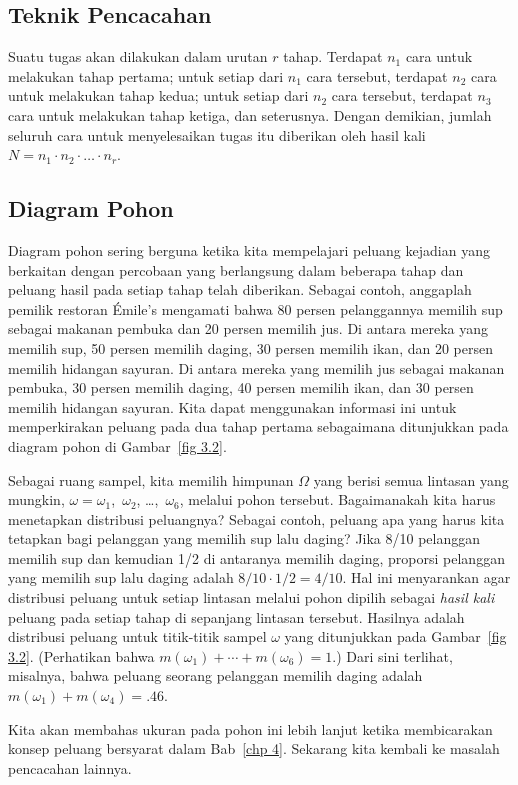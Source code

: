 
\subsection*{Teknik Pencacahan}

Suatu tugas akan dilakukan dalam urutan $r$ tahap.  Terdapat $n_1$ cara untuk
melakukan tahap pertama; untuk setiap dari $n_1$ cara tersebut, terdapat $n_2$ cara
untuk melakukan tahap kedua; untuk setiap dari $n_2$ cara tersebut, terdapat
$n_3$ cara untuk melakukan tahap ketiga, dan seterusnya.  Dengan demikian, jumlah
seluruh cara untuk menyelesaikan tugas itu diberikan oleh hasil kali
$N = n_1 \cdot n_2 \cdot \dots \cdot n_r$.

 
\subsection*{Diagram Pohon}

Diagram pohon sering berguna ketika kita mempelajari peluang kejadian yang berkaitan
dengan percobaan yang berlangsung dalam beberapa tahap dan peluang hasil pada setiap
tahap telah diberikan.  Sebagai contoh, anggaplah pemilik restoran \'Emile's mengamati
bahwa 80 persen pelanggannya memilih sup sebagai makanan pembuka dan 20 persen memilih
jus.  Di antara mereka yang memilih sup, 50 persen memilih daging, 30 persen memilih
ikan, dan 20 persen memilih hidangan sayuran.  Di antara mereka yang memilih jus sebagai
makanan pembuka, 30 persen memilih daging, 40 persen memilih ikan, dan 30 persen memilih
hidangan sayuran.  Kita dapat menggunakan informasi ini untuk memperkirakan peluang pada
dua tahap pertama sebagaimana ditunjukkan pada diagram pohon di Gambar~\ref{fig 3.2}.

Sebagai ruang sampel, kita memilih himpunan $\Omega$ yang berisi semua lintasan yang
mungkin, $\omega =
\omega_1$,~$\omega_2$, \dots,~$\omega_6$, melalui pohon tersebut.
Bagaimanakah kita harus menetapkan distribusi peluangnya?  Sebagai contoh, peluang apa
yang harus kita tetapkan bagi pelanggan yang memilih sup lalu daging?  Jika 8/10
pelanggan memilih sup dan kemudian 1/2 di antaranya memilih daging, proporsi pelanggan
yang memilih sup lalu daging adalah $8/10 \cdot 1/2 = 4/10$.  Hal ini menyarankan agar
distribusi peluang untuk setiap lintasan melalui pohon dipilih sebagai {\em hasil kali}
peluang pada setiap tahap di sepanjang lintasan tersebut.  Hasilnya adalah distribusi
peluang untuk titik-titik sampel $\omega$ yang ditunjukkan pada Gambar~\ref{fig 3.2}.
(Perhatikan bahwa $m(\omega_1) + \cdots +
m(\omega_6) = 1$.)  Dari sini terlihat,
misalnya, bahwa peluang seorang pelanggan memilih daging adalah
$m(\omega_1) + m(\omega_4) = .46$.
\par
Kita akan membahas ukuran pada pohon ini lebih lanjut ketika membicarakan konsep
peluang bersyarat dalam Bab~\ref{chp 4}.    Sekarang kita kembali ke masalah pencacahan
lainnya.

